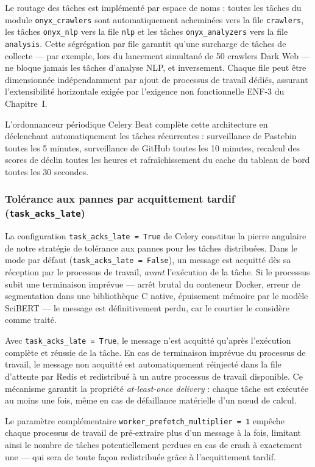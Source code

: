 Le routage des tâches est implémenté par espace de noms : toutes les tâches du module \texttt{onyx\_crawlers} sont automatiquement acheminées vers la file \texttt{crawlers}, les tâches \texttt{onyx\_nlp} vers la file \texttt{nlp} et les tâches \texttt{onyx\_analyzers} vers la file \texttt{analysis}. Cette ségrégation par file garantit qu'une surcharge de tâches de collecte --- par exemple, lors du lancement simultané de 50 crawlers Dark Web --- ne bloque jamais les tâches d'analyse NLP, et inversement. Chaque file peut être dimensionnée indépendamment par ajout de processus de travail dédiés, assurant l'extensibilité horizontale exigée par l'exigence non fonctionnelle ENF-3 du Chapitre~I.

L'ordonnanceur périodique Celery Beat complète cette architecture en déclenchant automatiquement les tâches récurrentes : surveillance de Pastebin toutes les 5 minutes, surveillance de GitHub toutes les 10 minutes, recalcul des scores de déclin toutes les heures et rafraîchissement du cache du tableau de bord toutes les 30 secondes.

\subsubsection{Tolérance aux pannes par acquittement tardif (\texttt{task\_acks\_late})}

La configuration \texttt{task\_acks\_late = True} de Celery constitue la pierre angulaire de notre stratégie de tolérance aux pannes pour les tâches distribuées. Dans le mode par défaut (\texttt{task\_acks\_late = False}), un message est acquitté dès sa réception par le processus de travail, \textit{avant} l'exécution de la tâche. Si le processus subit une terminaison imprévue --- arrêt brutal du conteneur Docker, erreur de segmentation dans une bibliothèque C native, épuisement mémoire par le modèle SciBERT --- le message est définitivement perdu, car le courtier le considère comme traité.

Avec \texttt{task\_acks\_late = True}, le message n'est acquitté qu'après l'exécution complète et réussie de la tâche. En cas de terminaison imprévue du processus de travail, le message non acquitté est automatiquement réinjecté dans la file d'attente par Redis et redistribué à un autre processus de travail disponible. Ce mécanisme garantit la propriété \textit{at-least-once delivery} : chaque tâche est exécutée au moins une fois, même en cas de défaillance matérielle d'un n\oe ud de calcul.

Le paramètre complémentaire \texttt{worker\_prefetch\_multiplier = 1} empêche chaque processus de travail de pré-extraire plus d'un message à la fois, limitant ainsi le nombre de tâches potentiellement perdues en cas de crash à exactement une --- qui sera de toute façon redistribuée grâce à l'acquittement tardif.

